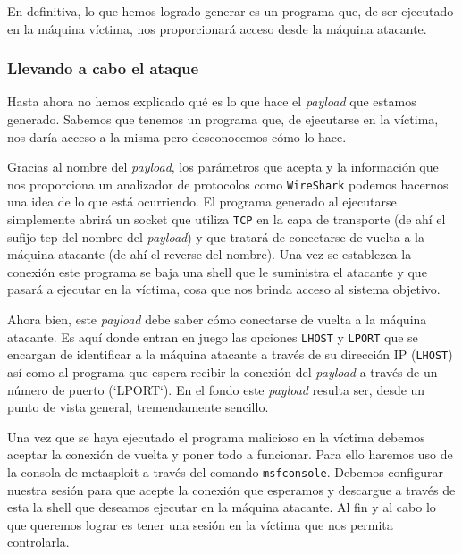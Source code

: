 \documentclass[12pt]{article}
\newcommand{\newpar} {
    \vskip 0.5cm
}
\begin{document}
                \newpar

                En definitiva, lo que hemos logrado generar es un programa que, de ser ejecutado en la máquina víctima, nos proporcionará acceso desde la máquina atacante.

            \subsubsection{Llevando a cabo el ataque}
                Hasta ahora no hemos explicado qué es lo que hace el \textit{payload} que estamos generado. Sabemos que tenemos un programa que, de ejecutarse en la víctima, nos daría acceso a la misma pero desconocemos cómo lo hace.

                \newpar

                Gracias al nombre del \textit{payload}, los parámetros que acepta y la información que nos proporciona un analizador de protocolos como \texttt{WireShark} podemos hacernos una idea de lo que está ocurriendo. El programa generado al ejecutarse simplemente abrirá un socket que utiliza \texttt{TCP} en la capa de transporte (de ahí el sufijo tcp del nombre del \textit{payload}) y que tratará de conectarse de vuelta a la máquina atacante (de ahí el reverse del nombre). Una vez se establezca la conexión este programa se baja una shell que le suministra el atacante y que pasará a ejecutar en la víctima, cosa que nos brinda acceso al sistema objetivo.

                \newpar

                Ahora bien, este \textit{payload} debe saber cómo conectarse de vuelta a la máquina atacante. Es aquí donde entran en juego las opciones \texttt{LHOST} y \texttt{LPORT} que se encargan de identificar a la máquina atacante a través de su dirección IP (\texttt{LHOST}) así como al programa que espera recibir la conexión del \textit{payload} a través de un número de puerto (`LPORT`). En el fondo este \textit{payload} resulta ser, desde un punto de vista general, tremendamente sencillo.

                \newpar

                Una vez que se haya ejecutado el programa malicioso en la víctima debemos aceptar la conexión de vuelta y poner todo a funcionar. Para ello haremos uso de la consola de metasploit a través del comando \texttt{msfconsole}. Debemos configurar nuestra sesión para que acepte la conexión que esperamos y descargue a través de esta la shell que deseamos ejecutar en la máquina atacante. Al fin y al cabo lo que queremos lograr es tener una sesión en la víctima que nos permita controlarla.
\end{document}
